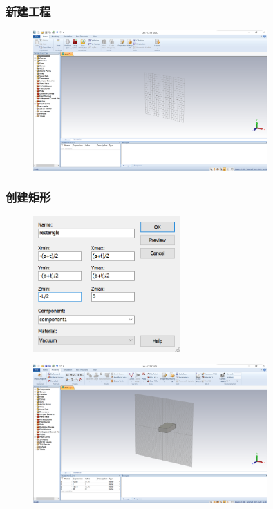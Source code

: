 \documentclass{../source/zjureport}
\begin{document}
            \subsubsection{新建工程}
            \begin{figure}[thp]
                \centering
                \includegraphics[width = 0.8\textwidth]{figure/1.png}
            \end{figure}
            \subsubsection{创建矩形}
            \begin{figure}[thp]
                \centering
                \includegraphics[width = 0.5\textwidth]{figure/矩形参数.png}
            \end{figure}
            \newpage
            \begin{figure}[thp]
                \centering
                \includegraphics[width = 0.8\textwidth]{figure/创建矩形.png}
            \end{figure}
\end{document}
